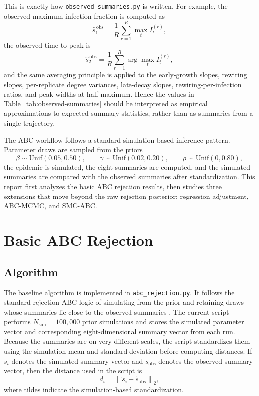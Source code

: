\documentclass[11pt]{article}
\begin{document}
This is exactly how \texttt{observed\_summaries.py} is written. For example, the observed maximum infection fraction is computed as
\[
\widehat{s}^{\,\mathrm{obs}}_1
= \frac{1}{R}\sum_{r=1}^{R} \max_t I_t^{(r)},
\]
the observed time to peak is
\[
\widehat{s}^{\,\mathrm{obs}}_2
= \frac{1}{R}\sum_{r=1}^{R} \arg\max_t I_t^{(r)},
\]
and the same averaging principle is applied to the early-growth slopes, rewiring slopes, per-replicate degree variances, late-decay slopes, rewiring-per-infection ratios, and peak widths at half maximum. Hence the values in Table~\ref{tab:observed-summaries} should be interpreted as empirical approximations to expected summary statistics, rather than as summaries from a single trajectory.

The ABC workflow follows a standard simulation-based inference pattern. Parameter draws are sampled from the priors
\[
\beta \sim \mathrm{Unif}(0.05,0.50), \qquad
\gamma \sim \mathrm{Unif}(0.02,0.20), \qquad
\rho \sim \mathrm{Unif}(0,0.80),
\]
the epidemic is simulated, the eight summaries are computed, and the simulated summaries are compared with the observed summaries after standardization. This report first analyzes the basic ABC rejection results, then studies three extensions that move beyond the raw rejection posterior: regression adjustment, ABC-MCMC, and SMC-ABC.
\section{Basic ABC Rejection}

\subsection{Algorithm}

The baseline algorithm is implemented in \texttt{abc\_rejection.py}. It follows the standard rejection-ABC logic of simulating from the prior and retaining draws whose summaries lie close to the observed summaries \citep{beaumont2002}. The current script performs $N_{\text{sim}}=100{,}000$ prior simulations and stores the simulated parameter vector and corresponding eight-dimensional summary vector from each run. Because the summaries are on very different scales, the script standardizes them using the simulation mean and standard deviation before computing distances. If $s_i$ denotes the simulated summary vector and $s_{\text{obs}}$ denotes the observed summary vector, then the distance used in the script is
\[
d_i = \left\lVert \tilde{s}_i - \tilde{s}_{\text{obs}} \right\rVert_2,
\]
where tildes indicate the simulation-based standardization.
\end{document}
